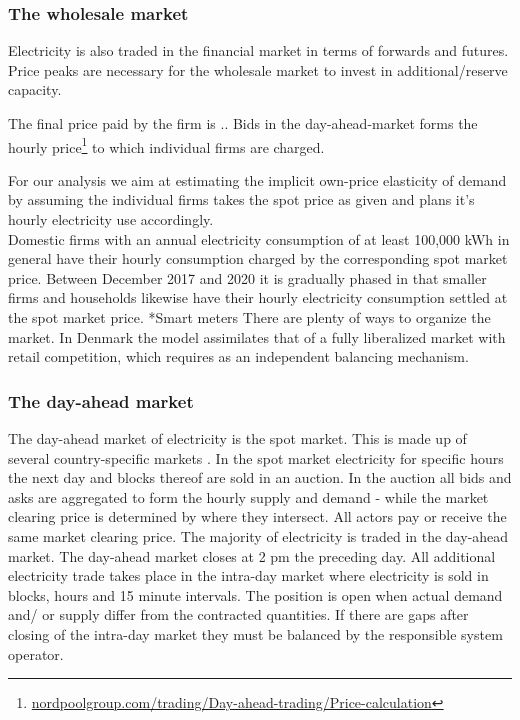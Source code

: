 \subsubsection{The wholesale market}
\label{subsubsec: t_whomarket}

Electricity is also traded in the financial market in terms of forwards and futures. Price peaks are necessary for the wholesale market to invest in additional/reserve capacity. 

 

The final price paid by the firm is .. 
Bids in the day-ahead-market forms the hourly price\footnote{\url{nordpoolgroup.com/trading/Day-ahead-trading/Price-calculation}} to which individual firms are charged. 

For our analysis we aim at estimating the implicit own-price elasticity of demand by assuming the individual firms takes the spot price as given and plans it's hourly electricity use accordingly.
\medskip\\
Domestic firms with an annual electricity consumption of at least 100,000 kWh in general have their hourly consumption charged by the corresponding spot market price. Between December 2017 and 2020 it is gradually phased in that
smaller firms and households likewise have their hourly electricity consumption settled at the spot market price.
*Smart meters
There are plenty of ways to organize the market. In Denmark the model assimilates that of a fully liberalized market with retail competition, which requires as an independent balancing mechanism. 

\subsubsection{The day-ahead market}
The day-ahead market of electricity is the spot market. This is made up of several country-specific markets . In the spot market electricity for specific hours the next day and blocks thereof are sold in an auction. In the auction all bids and asks are aggregated to form the hourly supply and demand - while the market clearing price is determined by where they intersect. All actors pay or receive the same market clearing price. The majority of electricity is traded in the day-ahead market. %
The day-ahead market closes at 2 pm the preceding day. All additional electricity trade takes place in the intra-day market where electricity is sold in blocks, hours and 15 minute intervals. The position is open when actual demand and/ or supply differ from the contracted quantities. If there are gaps after closing of the intra-day market they must be balanced by the responsible system operator.  



